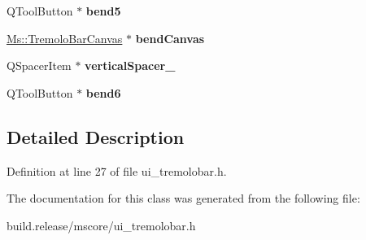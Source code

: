 \begin{DoxyCompactItemize}
Q\+Tool\+Button $\ast$ {\bfseries bend5}
\item 
\mbox{\label{class_ui___tremolo_bar_dialog_ab7121ef039f37a6fa02e91b3893f0481}} 
\hyperlink{class_ms_1_1_tremolo_bar_canvas}{Ms\+::\+Tremolo\+Bar\+Canvas} $\ast$ {\bfseries bend\+Canvas}
\item 
\mbox{\label{class_ui___tremolo_bar_dialog_a7fac138ee0c9ca5e87741377e013f18a}} 
Q\+Spacer\+Item $\ast$ {\bfseries vertical\+Spacer\+\_}
\item 
\mbox{\label{class_ui___tremolo_bar_dialog_a1b45a9c85c6c830f71080ce9104eace0}} 
Q\+Tool\+Button $\ast$ {\bfseries bend6}
\end{DoxyCompactItemize}


\subsection{Detailed Description}


Definition at line 27 of file ui\+\_\+tremolobar.\+h.



The documentation for this class was generated from the following file\+:\begin{DoxyCompactItemize}
\item 
build.\+release/mscore/ui\+\_\+tremolobar.\+h\end{DoxyCompactItemize}
